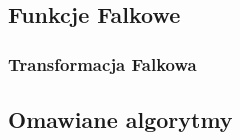 \subsection*{Funkcje Falkowe}





\subsubsection*{Transformacja Falkowa}




\subsection*{Omawiane algorytmy}